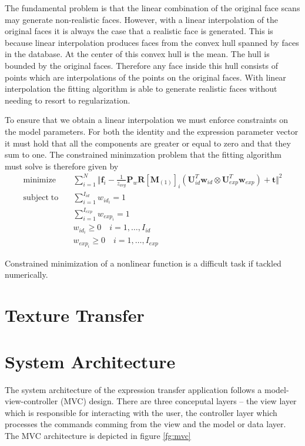 \documentclass[11pt,a4paper]{report}
\begin{document}
The fundamental problem is that the linear
combination of the original face scans may generate non-realistic faces. However, with a linear interpolation of
the original faces it is always the case that a realistic face is
generated. This is because linear interpolation produces faces from the convex hull spanned by
faces in the database. At the center of this convex hull is the mean. The hull
is bounded by the original faces. Therefore any face inside this hull consists
of points which are interpolations of the points on the original faces. With linear interpolation the fitting algorithm is able to generate realistic faces without needing to resort to regularization.

To ensure that we obtain a linear interpolation we must enforce constraints on
the model parameters. For both the identity and the expression parameter vector
it must hold that all the components are greater or equal to zero and
that they sum to one. The constrained minimzation problem that the fitting
algorithm must solve is therefore given by
\begin{align}
\mathrm{minimize}\quad &\sum_{i=1}^N \Big\Vert\mathbf{f}_i - \frac{1}{z_{avg}}\mathbf{P}_w\mathbf{R}[\mathbf{M}_{(1)}]_{i}(\mathbf{U}_{id}^T\mathbf{w}_{id} \otimes
\mathbf{U}_{exp}^T\mathbf{w}_{exp}) + \mathbf{t}\Big\Vert^2\\
\mathrm{subject\; to}\quad &\sum_{i=1}^{I_{id}} w_{id_i} = 1\\
&\sum_{i=1}^{I_{exp}} w_{exp_i} = 1\\
&w_{id_i} \ge 0 \quad i=1,\ldots ,I_{id}\\ 
&w_{exp_i} \ge 0 \quad i=1,\ldots ,I_{exp}
\end{align}

Constrained minimization of a nonlinear function is a difficult task if tackled numerically.

\section{Texture Transfer}

\section{System Architecture}
The system architecture of the expression transfer application follows a
model-view-controller (MVC) design. There are three conceputal layers -- the
view layer which is responsible for interacting with the user, the controller
layer which processes the commands comming from the view and the model or data
layer. The MVC architecture is depicted in figure \ref{fg:mvc} 
\end{document}
